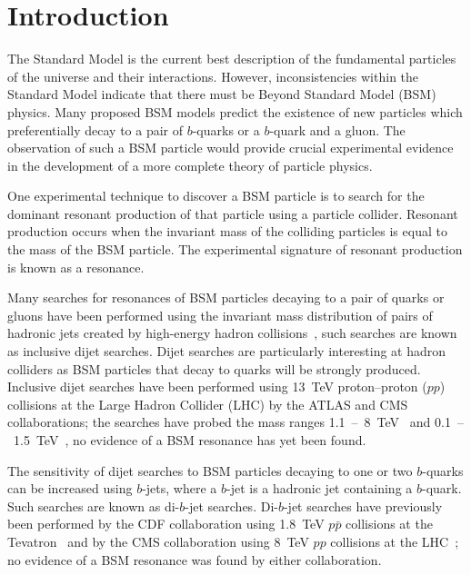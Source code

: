 \chapter{Introduction}
\label{sec:int}
The Standard Model is the current best description of the fundamental particles of the universe and their interactions.
However, inconsistencies within the Standard Model indicate that
there must be Beyond Standard Model (BSM) physics.
Many proposed BSM models predict the existence of new particles
which preferentially decay to a pair of $b$-quarks or a $b$-quark and a gluon.
The observation of such a BSM particle would provide crucial experimental
evidence in the development of a more complete theory of particle physics.


One experimental technique to discover a BSM particle is to search for
the dominant resonant production of that particle using a particle collider.
Resonant production occurs when the invariant mass of the colliding particles is equal to the mass of the BSM particle.
The experimental signature of resonant production is known as a resonance.

Many searches for resonances of BSM particles decaying to a pair of quarks or gluons
have been performed using the invariant mass distribution of pairs of hadronic jets created
by high-energy hadron collisions~\cite{theo-dijet_harris}, such searches are known as inclusive dijet searches.
Dijet searches are particularly interesting at hadron colliders as BSM particles
that decay to quarks will be strongly produced.
Inclusive dijet searches have been performed using 13~TeV \mbox{proton--proton} ($pp$) collisions at the
Large Hadron Collider (LHC) by the ATLAS and CMS collaborations;
the searches have probed the mass ranges 1.1~--~8~TeV~\cite{dijet-mori16_paper,dijet-mori17_paper,dijet-cms}
and 0.1~--~1.5~TeV~\cite{dijet-isr,dijet-TLA,dijet-isr_cms},
no evidence of a BSM resonance has yet been found.

The sensitivity of dijet searches to BSM particles decaying to one or two $b$-quarks can be increased
using $b$-jets, where a $b$-jet is a hadronic jet containing a $b$-quark.
Such searches are known as di-$b$-jet searches.
Di-$b$-jet searches have previously been performed by
the CDF collaboration using 1.8~TeV $p\bar{p}$ collisions at the Tevatron~\cite{dibjet-cdf}
and by the CMS collaboration using 8~TeV $pp$ collisions at the LHC~\cite{dibjet-cms};
no evidence of a BSM resonance was found by either collaboration.


